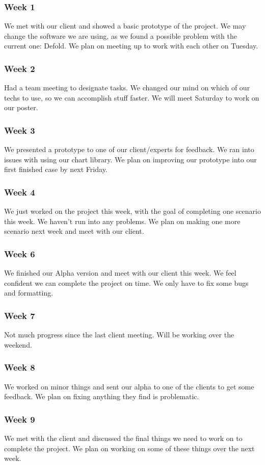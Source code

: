 \subsubsection{Week 1}
We met with our client and showed a basic prototype of the project. We may change the software we are using, as we found a possible problem with the current one: Defold. We plan on meeting up to work with each other on Tuesday.
\subsubsection{Week 2}
Had a team meeting to designate tasks. We changed our mind on which of our techs to use, so we can accomplish stuff faster. We will meet Saturday to work on our poster.
\subsubsection{Week 3}
We presented a prototype to one of our client/experts for feedback. We ran into issues with using our chart library. We plan on improving our prototype into our first finished case by next Friday.
\subsubsection{Week 4}
We just worked on the project this week, with the goal of completing one scenario this week. We haven't run into any problems. We plan on making one more scenario next week and meet with our client.
\subsubsection{Week 6}
We finished our Alpha version and meet with our client this week. We feel confident we can complete the project on time. We only have to fix some bugs and formatting.
\subsubsection{Week 7}
Not much progress since the last client meeting. Will be working over the weekend.
\subsubsection{Week 8}
We worked on minor things and sent our alpha to one of the clients to get some feedback. We plan on fixing anything they find is problematic.
\subsubsection{Week 9}
We met with the client and discussed the final things we need to work on to complete the project. We plan on working on some of these things over the next week.
